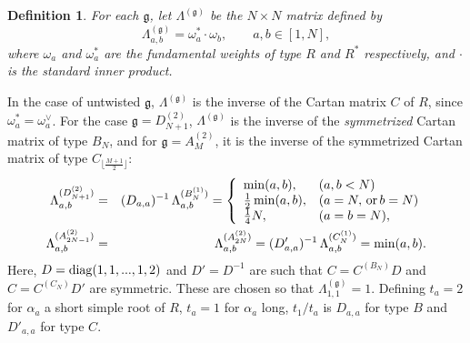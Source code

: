 \documentclass[12pt]{amsart}
\newtheorem{defn}[thm]{Definition}
\newcommand{\g}{{\mathfrak{g}}}
\newcommand{\half}{\frac{1}{2}}
\numberwithin{equation}{section}
\begin{document}
%
\begin{defn} \label{deflambda}
For each $\g$, let $\Lambda^{(\g)}$ be the $N\times N$ matrix defined by
\begin{equation}\label{deflambdag}
\Lambda^{(\g)}_{a,b}=\omega_a^*\cdot\omega_b , \qquad a,b\in[1,N],
\end{equation}
where $\omega_a$ and $\omega_a^*$ are the fundamental weights of type $R$ and $R^*$ respectively,
%
and $\cdot$ is the standard inner product.
\end{defn}
In the case of untwisted $\g$,  $\Lambda^{(\g)}$ is the inverse of the Cartan matrix $C$ of $R$,
since $\omega_a^*=\omega_a^\vee$.
For the case $\g=D_{N+1}^{(2)}$, $\Lambda^{(\g)}$ is the inverse of the {\it symmetrized} Cartan matrix of type $B_N$, and for $\g=A_{M}^{(2)}$, it is the inverse of the symmetrized Cartan matrix of type $C_{\lfloor \frac{M+1}{2}\rfloor}$:
\begin{eqnarray*}
\Lambda^{(D_{N+1}^{(2)})}_{a,b}&=& (D_{a,a})^{-1} \,\Lambda^{(B_N^{(1)})}_{a,b}=\left\{\begin{array}{ll}
\min(a,b) ,& (a,b<N) \\
\half \min(a,b), & (a=N,\, {\rm or}\, b=N)\\
\frac14 N, & (a=b=N),
\end{array}\right.\\
\Lambda^{(A_{2N-1}^{(2)})}_{a,b}&=&\Lambda^{(A_{2N}^{(2)})}_{a,b}=(D'_{a,a})^{-1} \,\Lambda^{(C_N^{(1)})}_{a,b}=\min(a,b).
\end{eqnarray*}
%
Here, $D={\rm diag}(1,1,...,1,2)$ and $D'=D^{-1}$ are such that $C=C^{(B_N)}D$ and $C=C^{(C_N)}D'$ are symmetric. These are chosen so that $\Lambda^{(\g)}_{1,1}=1$.
Defining $t_a=2$ for $\alpha_a$ a short simple root of $R$, $t_a=1$ for $\alpha_a$ long, $t_1/t_a$ is $D_{a,a}$ for type $B$
and $D'_{a,a}$ for type $C$.
\end{document}
